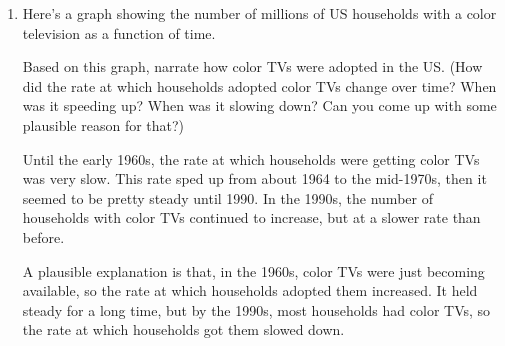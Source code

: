 \documentclass{article}
\begin{document}
\begin{enumerate}
  \begin{solution}
    Using the same reasoning as in \ref{martini-glass} and
    \ref{connally-2.5.14}, we find that the graph is increasing and
    concave up. 
  \end{solution}

\item   %


  \begin{problem}[\vfill]
    Here's a graph showing the number of millions of US households with a color television as a function of time.

    \begin{center}
    \end{center}

    Based on this graph, narrate how color TVs were adopted in the US. (How did the rate at which households adopted color TVs change over time? When was it speeding up? When was it slowing down? Can you come up with some plausible reason for that?)
  \end{problem}

  \begin{solution}
    Until the early 1960s, the rate at which households were getting color TVs was very slow. This rate sped up from about 1964 to the mid-1970s, then it seemed to be pretty steady until 1990. In the 1990s, the number of households with color TVs continued to increase, but at a slower rate than before.

    A plausible explanation is that, in the 1960s, color TVs were just becoming available, so the rate at which households adopted them increased. It held steady for a long time, but by the 1990s, most households had color TVs, so the rate at which households got them slowed down.
  \end{solution}

\end{enumerate}
\end{document}

